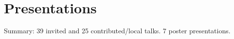 \documentclass[11pt,a4paper,sans]{moderncv}        %
\begin{document}
%




\section{Presentations}
Summary: 39 invited and 25 contributed/local talks. 7 poster presentations.
\end{document}
